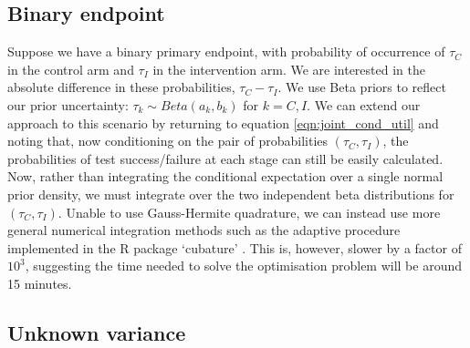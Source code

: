 \documentclass[sagev]{sagej}
\begin{document}

\subsection{Binary endpoint}

Suppose we have a binary primary endpoint, with probability of occurrence of $\tau_C$ in the control arm and $\tau_I$ in the intervention arm. We are interested in the absolute difference in these probabilities, $\tau_C - \tau_I$. We use Beta priors to reflect our prior uncertainty: $\tau_k \sim Beta(a_k, b_k)$ for $k = C, I$. We can extend our approach to this scenario by returning to equation \ref{eqn:joint_cond_util} and noting that, now conditioning on the pair of probabilities $(\tau_C, \tau_I)$, the probabilities of test success/failure at each stage can still be easily calculated. Now, rather than integrating the conditional expectation over a single normal prior density, we must integrate over the two independent beta distributions for $(\tau_C, \tau_I)$. Unable to use Gauss-Hermite quadrature, we can instead use more general numerical integration methods such as the adaptive procedure implemented in the R package `cubature' \cite{Narasimhan2018}. This is, however, slower by a factor of $10^3$, suggesting the time needed to solve the optimisation problem will be around 15 minutes.


\subsection{Unknown variance}
\end{document}
